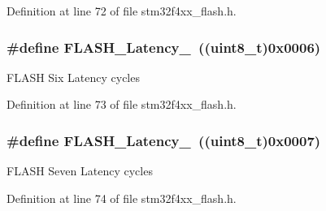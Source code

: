 Definition at line 72 of file stm32f4xx\-\_\-flash.\-h.

\hypertarget{group___flash___latency_ga053dfbef3307536ff40a5ceb2576a4a3}{
\subsubsection[{F\-L\-A\-S\-H\-\_\-\-Latency\-\_\-6}]{\setlength{\rightskip}{0pt plus 5cm}\#define F\-L\-A\-S\-H\-\_\-\-Latency\-\_~((uint8\-\_\-t)0x0006)}}\label{group___flash___latency_ga053dfbef3307536ff40a5ceb2576a4a3}
F\-L\-A\-S\-H Six Latency cycles 

Definition at line 73 of file stm32f4xx\-\_\-flash.\-h.

\hypertarget{group___flash___latency_ga352a374f6ae41d2cae767ed95efc6ae5}{
\subsubsection[{F\-L\-A\-S\-H\-\_\-\-Latency\-\_\-7}]{\setlength{\rightskip}{0pt plus 5cm}\#define F\-L\-A\-S\-H\-\_\-\-Latency\-\_~((uint8\-\_\-t)0x0007)}}\label{group___flash___latency_ga352a374f6ae41d2cae767ed95efc6ae5}
F\-L\-A\-S\-H Seven Latency cycles 

Definition at line 74 of file stm32f4xx\-\_\-flash.\-h.

